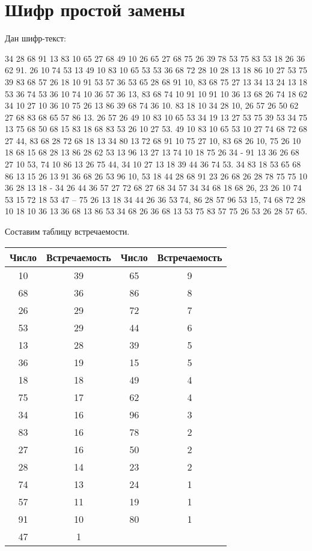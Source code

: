 \section{Шифр простой замены}

Дан шифр-текст:

34 28 68 91 13 83 10 65 27 68 49 10 26 65 27 68 75 26 39 78 53 75 83 53
18 26 36 62 91. 26 10 74 53 13 49 10 83 10 65 53 53 36 68 72 28 10 28 13 18 86
10 27 53 75 39 83 68 57 26 18 10 91 53 57 36 53 65 28 68 91 10, 83 68 75
27 13 34 13 24 13 18 53 36 74 53 36 10 74 10 36 57 36 13, 83 68 74 10
91 10 91 10 36 13 68 26 74 18 62 34 10 27 10 36 10 75 26 13 86 39 68 74 36
10. 83 18 10 34 28 10, 26 57 26 50 62 27 68 83 68 65 57 86 13. 26 57 26 49 10
83 10 65 53 34 19 13 27 53 75 39 53 34 75 13 75 68 50 68 15 83 18 68 83 53
26 10 27 53. 49 10 83 10 65 53 10 27 74 68 72 68 27 44, 83 68 28 72 68 18 13 34 80
13 72 68 91 10 75 27 10, 83 68 26 10, 75 26 10 18 68 15 68 28 13 86 28 62 53
13 96 13 27 13 74 10 18 75 26 34 - 91 13 36 26 68 27 10 53, 74 10 86 13 26 75
44, 34 10 27 13 18 39 44 36 74 53. 34 83 18 53 65 68 86 13 15 26 13 91 36 68 26
53 96 10, 53 18 44 28 68 91 23 26 68 26 28 78 75 75 10 36 28 13 18 - 34
26 44 36 57 27 72 68 27 68 34 57 34 34 68 18 68 26, 23 26 10 74 53 15 72 18
53 47 – 75 26 13 18 34 44 26 36 53 74, 86 28 57 96 53 15, 74 68 72 28 10 18 10
36 13 36 68 13 86 53 34 68 26 36 68 13 53 75 83 57 75 26 53 26 28 57 65.

Составим таблицу встречаемости.

\begin{table}[H]
	\centering
	\begin{tabular}{|c|c|c|c|}
		\hline
	Число & Встречаемость & Число & Встречаемость \\ \hline
		10 & 39 & 65 & 9  \\ \hline
		68 & 36 & 86 & 8  \\ \hline
		26 & 29 & 72 & 7  \\ \hline
		53 & 29 & 44 & 6  \\ \hline
		13 & 28 & 39 & 5  \\ \hline
		36 & 19 & 15 & 5  \\ \hline
		18 & 18 & 49 & 4  \\ \hline
		75 & 17 & 62 & 4  \\ \hline
		34 & 16 & 96 & 3  \\ \hline
		83 & 16 & 78 & 2  \\ \hline
		27 & 16 & 50 & 2  \\ \hline
		28 & 14 & 23 & 2  \\ \hline
		74 & 13 & 24 & 1  \\ \hline
		57 & 11 & 19 & 1  \\ \hline
		91 & 10 & 80 & 1  \\ \hline
		47 & 1 & & \\ \hline
	\end{tabular}
\end{table}

